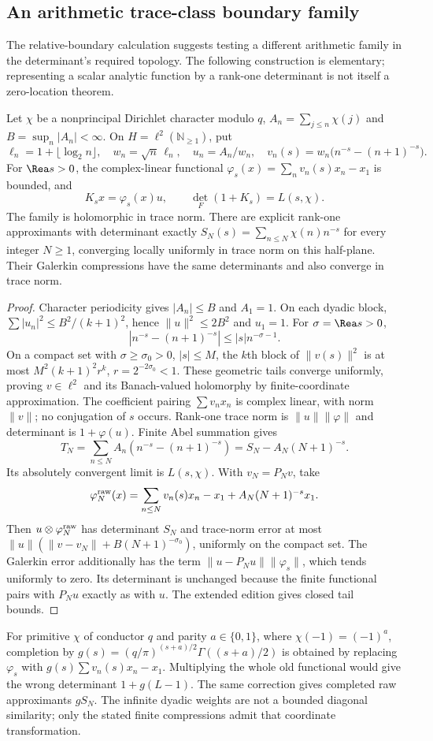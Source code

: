 \subsection{An arithmetic trace-class boundary family}
The relative-boundary calculation suggests testing a different arithmetic family in the determinant's required topology. The following construction is elementary; representing a scalar analytic function by a rank-one determinant is not itself a zero-location theorem.
\begin{theorem}\label{thm:abel-boundary}
Let $\chi$ be a nonprincipal Dirichlet character modulo $q$, $A_n=\sum_{j\le n}\chi(j)$ and $B=\sup_n|A_n|<\infty$. On $H=\ell^2(\mathbb N_{\ge1})$, put
\[
 \ell_n=1+\lfloor\log_2n\rfloor,\quad w_n=\sqrt n\,\ell_n,\quad
 u_n=A_n/w_n,\quad v_n(s)=w_n\bigl(n^{-s}-(n+1)^{-s}\bigr).
\]
For $\Rea s>0$, the complex-linear functional
$\varphi_s(x)=\sum_n v_n(s)x_n-x_1$ is bounded, and
\[
 K_sx=\varphi_s(x)u,\qquad \det_F(1+K_s)=L(s,\chi).
\]
The family is holomorphic in trace norm. There are explicit rank-one approximants with determinant exactly $S_N(s)=\sum_{n\le N}\chi(n)n^{-s}$ for every integer $N\ge1$, converging locally uniformly in trace norm on this half-plane. Their Galerkin compressions have the same determinants and also converge in trace norm.
\end{theorem}
\begin{proof}
Character periodicity gives $|A_n|\le B$ and $A_1=1$. On each dyadic block,
$\sum|u_n|^2\le B^2/(k+1)^2$, hence $\|u\|^2\le2B^2$ and $u_1=1$. For $\sigma=\Rea s>0$,
\[
 |n^{-s}-(n+1)^{-s}|\le |s|n^{-\sigma-1}.
\]
On a compact set with $\sigma\ge\sigma_0>0$, $|s|\le M$, the $k$th block of $\|v(s)\|^2$ is at most $M^2(k+1)^2r^k$, $r=2^{-2\sigma_0}<1$. These geometric tails converge uniformly, proving $v\in\ell^2$ and its Banach-valued holomorphy by finite-coordinate approximation. The coefficient pairing $\sum v_nx_n$ is complex linear, with norm $\|v\|$; no conjugation of $s$ occurs. Rank-one trace norm is $\|u\|\|\varphi\|$ and determinant is $1+\varphi(u)$. Finite Abel summation gives
\[
 T_N=\sum_{n\le N}A_n(n^{-s}-(n+1)^{-s})
     =S_N-A_N(N+1)^{-s}.
\]
Its absolutely convergent limit is $L(s,\chi)$. With $v_N=P_Nv$, take
\[
 \varphi_N^{\rm raw}(x)=\sum_{n\le N}v_n(s)x_n-x_1
                 +A_N(N+1)^{-s}x_1.
\]
Then $u\otimes\varphi_N^{\rm raw}$ has determinant $S_N$ and trace-norm error at most
$\|u\|(\|v-v_N\|+B(N+1)^{-\sigma_0})$, uniformly on the compact set. The Galerkin error additionally has the term $\|u-P_Nu\|\|\varphi_s\|$, which tends uniformly to zero. Its determinant is unchanged because the finite functional pairs with $P_Nu$ exactly as with $u$. The extended edition gives closed tail bounds.
\end{proof}
For primitive $\chi$ of conductor $q$ and parity $a\in\{0,1\}$, where $\chi(-1)=(-1)^a$, completion by
$g(s)=(q/\pi)^{(s+a)/2}\Gamma((s+a)/2)$ is obtained by replacing $\varphi_s$ with $g(s)\sum v_n(s)x_n-x_1$. Multiplying the whole old functional would give the wrong determinant $1+g(L-1)$. The same correction gives completed raw approximants $gS_N$. The infinite dyadic weights are not a bounded diagonal similarity; only the stated finite compressions admit that coordinate transformation.


